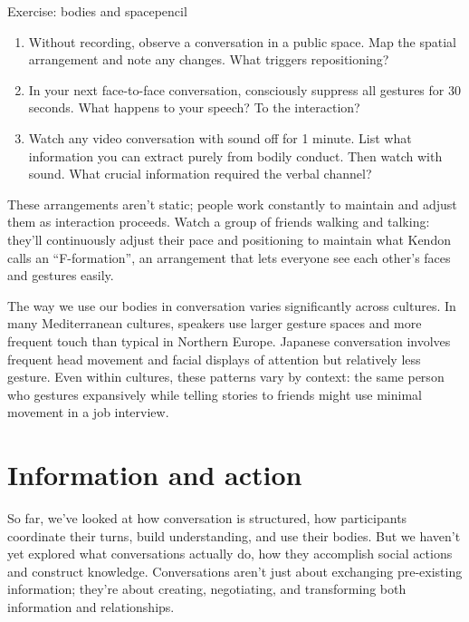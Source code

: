 \begin{tblsframedsymbol}{Exercise: bodies and space}{pencil}
\begin{enumerate}[noitemsep, leftmargin=*]
    \item Without recording, observe a conversation in a public space. Map the spatial arrangement and note any changes. What triggers repositioning?
    \item In your next face-to-face conversation, consciously suppress all gestures for 30 seconds. What happens to your speech? To the interaction?
    \item Watch any video conversation with sound off for 1 minute. List what information you can extract purely from bodily conduct. Then watch with sound. What crucial information required the verbal channel?
\end{enumerate}
\end{tblsframedsymbol}

These arrangements aren't static; people work constantly to maintain and adjust them as interaction proceeds. Watch a group of friends walking and talking: they'll continuously adjust their pace and positioning to maintain what Kendon calls an \enquote{F-formation}, an arrangement that lets everyone see each other's faces and gestures easily.

The way we use our bodies in conversation varies significantly across cultures. In many Mediterranean cultures, speakers use larger gesture spaces and more frequent touch than typical in Northern Europe. Japanese conversation involves frequent head movement and facial displays of attention but relatively less gesture. Even within cultures, these patterns vary by context: the same person who gestures expansively while telling stories to friends might use minimal movement in a job interview.

\section{Information and action} \label{sec:info-action}

So far, we've looked at how conversation is structured, how participants coordinate their turns, build understanding, and use their bodies. But we haven't yet explored what conversations actually do, how they accomplish social actions and construct knowledge. Conversations aren't just about exchanging pre-existing information; they're about creating, negotiating, and transforming both information and relationships.

